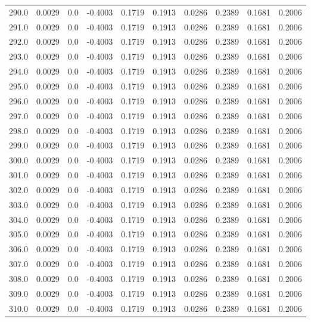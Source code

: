 \begin{longtable}{lrrrrrrrrr}
290.0 & 0.0029 & 0.0 & -0.4003 & 0.1719 & 0.1913 & 0.0286 & 0.2389 & 0.1681 & 0.2006 \\
291.0 & 0.0029 & 0.0 & -0.4003 & 0.1719 & 0.1913 & 0.0286 & 0.2389 & 0.1681 & 0.2006 \\
292.0 & 0.0029 & 0.0 & -0.4003 & 0.1719 & 0.1913 & 0.0286 & 0.2389 & 0.1681 & 0.2006 \\
293.0 & 0.0029 & 0.0 & -0.4003 & 0.1719 & 0.1913 & 0.0286 & 0.2389 & 0.1681 & 0.2006 \\
294.0 & 0.0029 & 0.0 & -0.4003 & 0.1719 & 0.1913 & 0.0286 & 0.2389 & 0.1681 & 0.2006 \\
295.0 & 0.0029 & 0.0 & -0.4003 & 0.1719 & 0.1913 & 0.0286 & 0.2389 & 0.1681 & 0.2006 \\
296.0 & 0.0029 & 0.0 & -0.4003 & 0.1719 & 0.1913 & 0.0286 & 0.2389 & 0.1681 & 0.2006 \\
297.0 & 0.0029 & 0.0 & -0.4003 & 0.1719 & 0.1913 & 0.0286 & 0.2389 & 0.1681 & 0.2006 \\
298.0 & 0.0029 & 0.0 & -0.4003 & 0.1719 & 0.1913 & 0.0286 & 0.2389 & 0.1681 & 0.2006 \\
299.0 & 0.0029 & 0.0 & -0.4003 & 0.1719 & 0.1913 & 0.0286 & 0.2389 & 0.1681 & 0.2006 \\
300.0 & 0.0029 & 0.0 & -0.4003 & 0.1719 & 0.1913 & 0.0286 & 0.2389 & 0.1681 & 0.2006 \\
301.0 & 0.0029 & 0.0 & -0.4003 & 0.1719 & 0.1913 & 0.0286 & 0.2389 & 0.1681 & 0.2006 \\
302.0 & 0.0029 & 0.0 & -0.4003 & 0.1719 & 0.1913 & 0.0286 & 0.2389 & 0.1681 & 0.2006 \\
303.0 & 0.0029 & 0.0 & -0.4003 & 0.1719 & 0.1913 & 0.0286 & 0.2389 & 0.1681 & 0.2006 \\
304.0 & 0.0029 & 0.0 & -0.4003 & 0.1719 & 0.1913 & 0.0286 & 0.2389 & 0.1681 & 0.2006 \\
305.0 & 0.0029 & 0.0 & -0.4003 & 0.1719 & 0.1913 & 0.0286 & 0.2389 & 0.1681 & 0.2006 \\
306.0 & 0.0029 & 0.0 & -0.4003 & 0.1719 & 0.1913 & 0.0286 & 0.2389 & 0.1681 & 0.2006 \\
307.0 & 0.0029 & 0.0 & -0.4003 & 0.1719 & 0.1913 & 0.0286 & 0.2389 & 0.1681 & 0.2006 \\
308.0 & 0.0029 & 0.0 & -0.4003 & 0.1719 & 0.1913 & 0.0286 & 0.2389 & 0.1681 & 0.2006 \\
309.0 & 0.0029 & 0.0 & -0.4003 & 0.1719 & 0.1913 & 0.0286 & 0.2389 & 0.1681 & 0.2006 \\
310.0 & 0.0029 & 0.0 & -0.4003 & 0.1719 & 0.1913 & 0.0286 & 0.2389 & 0.1681 & 0.2006 \\

\end{longtable}
